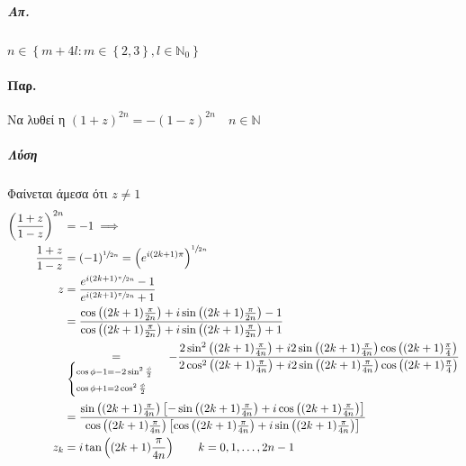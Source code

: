 \documentclass[12pt,a4paper,notitlepage,fleqn]{article}
\begin{document}
    \subparagraph{Απ.} \(
    n\in\left\lbrace m+4l: m\in\left\lbrace 2,3 \right\rbrace
    ,l\in \mathbb N_0
    \right\rbrace
     \)

    \paragraph{Παρ.}
    Να λυθεί η \( (1+z)^{2n}=-(1-z)^{2n}\quad n\in\mathbb N \)
    \subparagraph{Λύση}
    Φαίνεται άμεσα ότι \( z\neq 1 \)
    \begin{align*}
    \left(
    \frac{1+z}{1-z}
    \right)^{2n}&=-1 \implies \\
    \frac{1+z}{1-z} &= (-1)^{\sfrac{1}{2n}}
    = \left(e^{i(2k+1)\pi}\right)^{\sfrac{1}{2n}}
    \\ z&=\frac{
    	e^{i(2k+1)\sfrac{\pi}{2n}}-1
    	}{e^{i(2k+1)\sfrac{\pi}{2n}}+1}
    \\ &= \frac{
    	\cos\left((2k+1)\frac{\pi}{2n}\right)+i\sin\left((2k+1)\frac{\pi}{2n}\right)-1
    	}{
    	\cos\left((2k+1)\frac{\pi}{2n}\right)+i\sin\left((2k+1)\frac{\pi}{2n}\right)+1
    	}
    \\ & \underset{\textstyle \begin{cases}
    	\mathsmaller{\cos\phi-1=-2\sin^2\frac{\phi}{2}}\\
    	\mathsmaller{\cos\phi+1=2\cos^2\frac{\phi}{2}}
    	\end{cases}}{=} -\frac{
    	2\sin^2\left( (2k+1)\frac{\pi}{4n} \right)+i2\sin\left((2k+1)\frac{\pi}{4n}\right)\cos\left(
    	(2k+1)\frac{\pi}{4}
    	\right)
    	}{2\cos^2\left( (2k+1)\frac{\pi}{4n} \right)+i2\sin\left((2k+1)\frac{\pi}{4n}\right)\cos\left(
    	(2k+1)\frac{\pi}{4}
    	\right)}
    \\ &= \frac{
    	\sin\left((2k+1)\frac{\pi}{4n}\right)\left[
    	-\sin\left(
    	(2k+1)\frac{\pi}{4n}
    	\right)+i\cos\left(
    	(2k+1)\frac{\pi}{4n}
    	\right)
    	\right]
    	}{\cos\left(
    	(2k+1)\frac{\pi}{4n}
    	\right)\left[
    	\cos\left((2k+1)\frac{\pi}{4n}\right)+i\sin\left(
    	(2k+1)\frac{\pi}{4n}
    	\right)
    	\right]}
    \\ z_k &= i\tan\left((2k+1)\frac{\pi}{4n}\right) \qquad
    k=0,1,\dots,2n-1
    \end{align*}
\end{document}
